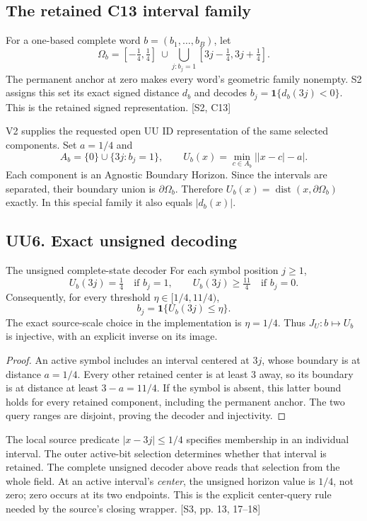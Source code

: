 \documentclass[11pt,a4paper]{article}
\numberwithin{equation}{section}
\newcommand{\src}[2]{{\sffamily\small\color{slate}[#1, #2]}}
\newcommand{\ind}{\mathbf 1}
\newcommand{\dist}{\operatorname{dist}}
\begin{document}
\subsection{The retained C13 interval family}
For a one-based complete word $b=(b_1,\ldots,b_B)$, let
\begin{equation}
\Omega_b=[-\tfrac14,\tfrac14]\ \cup\!
\bigcup_{j:b_j=1}[3j-\tfrac14,3j+\tfrac14].
\label{eq:c13}
\end{equation}
The permanent anchor at zero makes every word's geometric family nonempty. S2 assigns this set its exact signed distance $d_b$ and decodes $b_j=\ind\{d_b(3j)<0\}$. This is the retained signed representation. \src{S2}{C13}

V2 supplies the requested open UU ID representation of the same selected components. Set $a=1/4$ and
\begin{equation}
A_b=\{0\}\cup\{3j:b_j=1\},\qquad
U_b(x)=\min_{c\in A_b}\left||x-c|-a\right|.
\label{eq:unsigned-state}
\end{equation}
Each component is an Agnostic Boundary Horizon. Since the intervals are separated, their boundary union is $\partial\Omega_b$. Therefore $U_b(x)=\dist(x,\partial\Omega_b)$ exactly. In this special family it also equals $|d_b(x)|$.

\subsection{UU6. Exact unsigned decoding}
\begin{formal}{The unsigned complete-state decoder}
For each symbol position $j\ge1$,
\[
U_b(3j)=\tfrac14\quad\text{if }b_j=1,
\qquad
U_b(3j)\ge\tfrac{11}{4}\quad\text{if }b_j=0.
\]
Consequently, for every threshold $\eta\in[1/4,11/4)$,
\[
b_j=\ind\{U_b(3j)\le\eta\}.
\]
The exact source-scale choice in the implementation is $\eta=1/4$. Thus $J_U:b\mapsto U_b$ is injective, with an explicit inverse on its image.
\end{formal}
\begin{proof}
An active symbol includes an interval centered at $3j$, whose boundary is at distance $a=1/4$. Every other retained center is at least 3 away, so its boundary is at distance at least $3-a=11/4$. If the symbol is absent, this latter bound holds for every retained component, including the permanent anchor. The two query ranges are disjoint, proving the decoder and injectivity.
\end{proof}

The local source predicate $|x-3j|\le1/4$ specifies membership in an individual interval. The outer active-bit selection determines whether that interval is retained. The complete unsigned decoder above reads that selection from the whole field. At an active interval's \emph{center}, the unsigned horizon value is $1/4$, not zero; zero occurs at its two endpoints. This is the explicit center-query rule needed by the source's closing wrapper. \src{S3}{pp. 13, 17--18}
\end{document}

